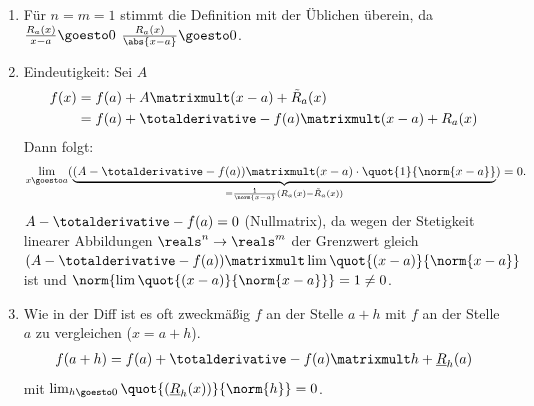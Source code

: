 \begin{bemerkungen*}
    \begin{enumerate}
        \item Für \( n=m=1 \) stimmt die Definition mit der Üblichen überein, da \( \frac{R_a(x)}{x-a}\goesto 0 \) \tiff \( \frac{R_a(x)}{\abs{x-a}}\goesto 0 \).
        \item Eindeutigkeit: Sei \( A \) \sd
        \begin{align*}
            f(x)\begin{aligned}[t]
                &=f(a)+A\matrixmult(x-a)+\tilde{R}_a(x)\\
                &=f(a)+\totalderivative-{f}(a)\matrixmult (x-a)+R_a(x)
            \end{aligned}            
        \end{align*}
        Dann folgt:
        \begin{align*}
            \lim_{x \goesto a}(\underbrace{(A-\totalderivative-{f}(a))\matrixmult (x-a)\cdot\quot{1}{\norm{x-a}}}_{=\frac{1}{\norm{x-a}}(R_a(x)-\tilde{R}_a(x))})=0.
        \end{align*}
        \timplies \( A-\totalderivative-{f}(a)=0 \) (Nullmatrix), da wegen der Stetigkeit linearer Abbildungen \( \reals^n\to \reals^m \) der Grenzwert gleich \( (A-\totalderivative-{f}(a))\matrixmult \lim \quot{(x-a)}{\norm{x-a}} \) ist und \( \norm{\lim \quot{(x-a)}{\norm{x-a}}}=1\neq 0 \).
        \item Wie in der Diff  ist es oft zweckmäßig \( f \) an der Stelle \( a+h \) mit \( f \) an der Stelle \( a \) zu vergleichen (\( x=a+h \)).
        \begin{align*}
            f(a+h)=f(a)+\totalderivative-{f}(a)\matrixmult h+\underline{R}_h(a)
        \end{align*}
        mit \( \lim_{h \goesto 0}\quot{(\underline{R}_h(x))}{\norm{h}}=0 \).
    \end{enumerate}
\end{bemerkungen*}
